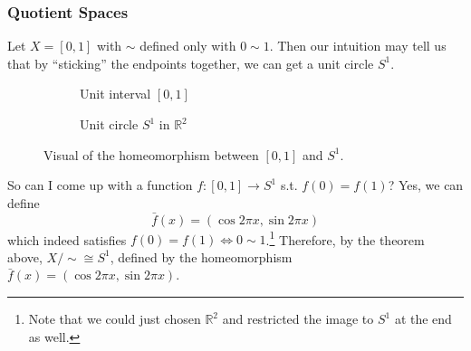 \subsubsection{Quotient Spaces}

  \begin{example}[1-Sphere]
    Let $X = [0, 1]$ with $\sim$ defined only with $0 \sim 1$. Then our intuition may tell us that by ``sticking'' the endpoints together, we can get a unit circle $S^1$. 

    \begin{figure}[H]
      \centering
      \begin{subfigure}[b]{0.48\textwidth}
        \centering
        \caption{Unit interval $[0, 1]$}
        \label{fig:unit-interval}
      \end{subfigure}
      \hfill 
      \begin{subfigure}[b]{0.48\textwidth}
        \centering
        \caption{Unit circle $S^1$ in $\mathbb{R}^2$}
        \label{fig:unit-circle}
      \end{subfigure}
      \caption{Visual of the homeomorphism between $[0, 1]$ and $S^1$.}
      \label{fig:comparison}
    \end{figure}

    So can I come up with a function $f: [0, 1] \rightarrow S^1$ s.t. $f(0) = f(1)$? Yes, we can define 
    \begin{equation}
      \bar{f}(x) = (\cos{2 \pi x}, \sin{2\pi x})
    \end{equation} 
    which indeed satisfies $f(0) = f(1) \iff 0 \sim 1$.\footnote{Note that we could just chosen $\mathbb{R}^2$ and restricted the image to $S^1$ at the end as well.} Therefore, by the theorem above, $X/{\sim} \cong S^1$, defined by the homeomorphism $\bar{f}(x) = (\cos{2 \pi x}, \sin{2\pi x})$.  
  \end{example}

